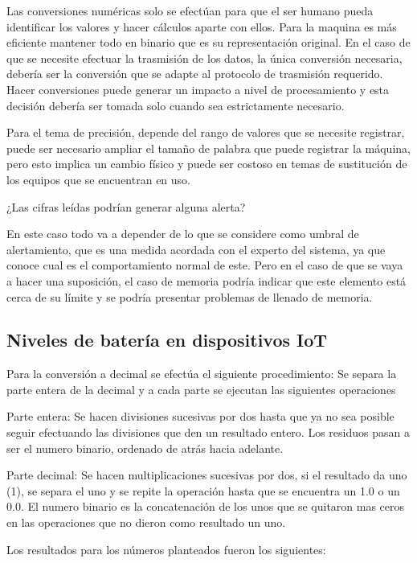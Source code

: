 \documentclass[stu, 12pt, letterpaper, donotrepeattitle, floatsintext, natbib]{apa7}
\begin{document}
Las conversiones numéricas solo se efectúan para que el ser humano pueda identificar los valores y hacer cálculos aparte con ellos. Para la maquina es más eficiente mantener todo en binario que es su representación original. En el caso de que se necesite efectuar la trasmisión de los datos, la única conversión necesaria, debería ser la conversión que se adapte al protocolo de trasmisión requerido. Hacer conversiones puede generar un impacto a nivel de procesamiento y esta decisión debería ser tomada solo cuando sea estrictamente necesario.

Para el tema de precisión, depende del rango de valores que se necesite registrar, puede ser necesario ampliar el tamaño de palabra que puede registrar la máquina, pero esto implica un cambio físico y puede ser costoso en temas de sustitución de los equipos que se encuentran en uso.

¿Las cifras leídas podrían generar alguna alerta?

En este caso todo va a depender de lo que se considere como umbral de alertamiento, que es una medida acordada con el experto del sistema, ya que conoce cual es el comportamiento normal de este. Pero en el caso de que se vaya a hacer una suposición, el caso de memoria podría indicar que este elemento está cerca de su límite y se podría presentar problemas de llenado de memoria.


\subsection{Niveles de batería en dispositivos IoT}
Para la conversión a decimal se efectúa el siguiente procedimiento:
Se separa la parte entera de la decimal y a cada parte se ejecutan las siguientes operaciones

Parte entera: Se hacen divisiones sucesivas por dos hasta que ya no sea posible seguir efectuando las divisiones que den un resultado entero. Los residuos pasan a ser el numero binario, ordenado de atrás hacia adelante.

Parte decimal: Se hacen multiplicaciones sucesivas por dos, si el resultado da uno (1), se separa el uno y se repite la operación hasta que se encuentra un 1.0 o un 0.0. El numero binario es la concatenación de los unos que se quitaron mas ceros en las operaciones que no dieron como resultado un uno.

Los resultados para los números planteados fueron los siguientes:
\end{document}
